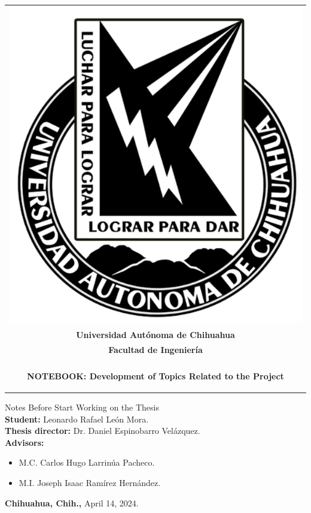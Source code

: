 \documentclass[12pt]{report}
\begin{document}
\begin{titlepage}
	\begin{center}
		\begin{tabular}{c}
			\includegraphics[scale=0.2]{BN_uach.png}\\[3.5ex]
			\textbf{\LARGE Universidad Autónoma de Chihuahua}\\[3.5ex]
			\textbf{\Large Facultad de Ingeniería}\\[3.5ex]
			\hline\\[3ex]
			\begin{minipage}{17cm}
				\centering
				\begin{doublespace}
					\textbf{\LARGE NOTEBOOK: Development of Topics Related to the Project}
				\end{doublespace}
			\end{minipage}\\[3.5ex]
			\hline
		\end{tabular}\vfill
		{\large Notes Before Start Working on the Thesis}\\\vfill
		{\large \textbf{Student:} Leonardo Rafael León Mora.}\\\vfill
		{\large \textbf{Thesis director:} Dr. Daniel Espinobarro Velázquez.}\\\vfill
		{\large \textbf{Advisors:}}\\[3.5ex]
		\begin{itemize}
			\item {\large M.C. Carlos Hugo Larrinúa Pacheco.}\\[3.5ex]
			\item {\large M.I. Joseph Isaac Ramírez Hernández.}\\[3.5ex]
		\end{itemize}
		\vfill
		{\large \textbf{Chihuahua, Chih.,} April 14, 2024.}\\[3.5ex]
	\end{center}
\end{titlepage}
\end{document}

